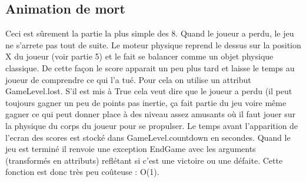 \documentclass[11pt]{article}
\begin{document}
\subsection{Animation de mort}
Ceci est sûrement la partie la plus simple des 8. Quand le joueur a perdu, le jeu ne s'arrete pas tout de suite. Le moteur physique reprend le dessus sur la position X du joueur (voir partie 5) et le fait se balancer comme un objet physique classique. De cette façon le score apparait un peu plus tard et laisse le temps au joueur de comprendre ce qui l'a tué. Pour cela on utilise un attribut GameLevel.lost. S'il est mis à True cela veut dire que le joueur a perdu (il peut toujours gagner un peu de points pas inertie, ça fait partie du jeu voire même gagner ce qui peut donner place à des niveau assez amusants où il faut jouer sur la physique du corps du joueur pour se propulser. Le temps avant l'apparition de l'ecran des scores est stocké dans GameLevel.countdown en secondes. Quand le jeu est terminé il renvoie une exception EndGame avec les arguments (transformés en attributs) reflétant si c'est une victoire ou une défaite. Cette fonction est donc très peu coûteuse : O(1).
\end{document}
